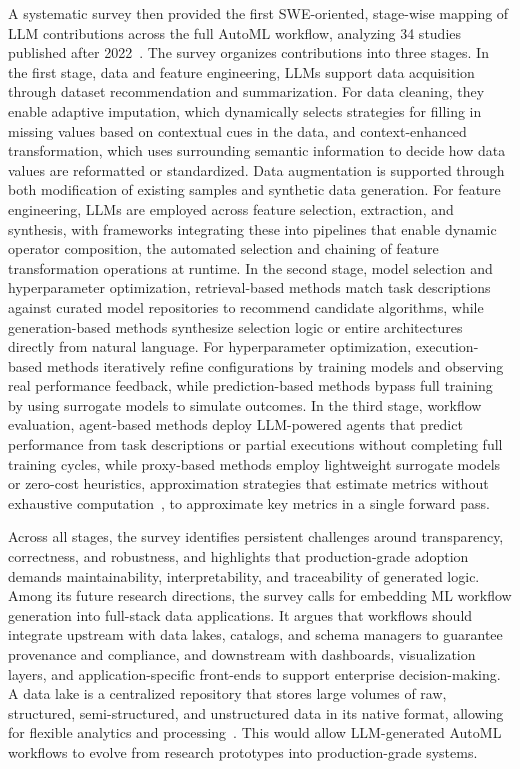 \documentclass[
english,                 %
bibtex,                  %
]{kththesis}
\numberwithin{listing}{chapter}
\begin{document}
A systematic survey then provided the first \gls{SWE}-oriented, stage-wise mapping of \gls{LLM} contributions across the full \gls{AutoML} workflow, analyzing 34 studies published after 2022~\cite{gu_large_2025}. The survey organizes contributions into three stages. In the first stage, data and feature engineering, \glspl{LLM} support data acquisition through dataset recommendation and summarization. For data cleaning, they enable adaptive imputation, which dynamically selects strategies for filling in missing values based on contextual cues in the data, and context-enhanced transformation, which uses surrounding semantic information to decide how data values are reformatted or standardized. Data augmentation is supported through both modification of existing samples and synthetic data generation. For feature engineering, \glspl{LLM} are employed across feature selection, extraction, and synthesis, with frameworks integrating these into pipelines that enable dynamic operator composition, the automated selection and chaining of feature transformation operations at runtime. In the second stage, model selection and hyperparameter optimization, retrieval-based methods match task descriptions against curated model repositories to recommend candidate algorithms, while generation-based methods synthesize selection logic or entire architectures directly from natural language. For hyperparameter optimization, execution-based methods iteratively refine configurations by training models and observing real performance feedback, while prediction-based methods bypass full training by using surrogate models to simulate outcomes. In the third stage, workflow evaluation, agent-based methods deploy \gls{LLM}-powered agents that predict performance from task descriptions or partial executions without completing full training cycles, while proxy-based methods employ lightweight surrogate models or zero-cost heuristics, approximation strategies that estimate metrics without exhaustive computation~\cite{hart_formal_1968}, to approximate key metrics in a single forward pass.

Across all stages, the survey identifies persistent challenges around transparency, correctness, and robustness, and highlights that production-grade adoption demands maintainability, interpretability, and traceability of generated logic. Among its future research directions, the survey calls for embedding \gls{ML} workflow generation into full-stack data applications. It argues that workflows should integrate upstream with data lakes, catalogs, and schema managers to guarantee provenance and compliance, and downstream with dashboards, visualization layers, and application-specific front-ends to support enterprise decision-making. A data lake is a centralized repository that stores large volumes of raw, structured, semi-structured, and unstructured data in its native format, allowing for flexible analytics and processing~\cite{hai_data_2023}. This would allow \gls{LLM}-generated \gls{AutoML} workflows to evolve from research prototypes into production-grade systems.
\end{document}
